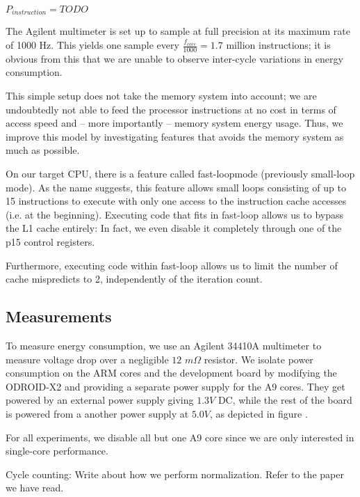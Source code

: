 \begin{center}
$P_{instruction} = TODO$
\end{center}

The Agilent multimeter is set up to sample at full precision at its maximum rate
of 1000 Hz. This yields one sample every $\frac{ f_{core} }{ 1000 } = 1.7$
million instructions; it is obvious from this that we are unable to observe
inter-cycle variations in energy consumption.

This simple setup does not take the memory system into account; we are
undoubtedly not able to feed the processor instructions at no cost in terms of
access speed and -- more importantly -- memory system energy usage. Thus, we
improve this model by investigating features that avoids the memory system as
much as possible.

On our target CPU, there is a feature called fast-loop\texttrademark mode
(previously small-loop mode). As the name suggests, this feature allows small
loops consisting of up to 15 instructions to execute with only one access to the
instruction cache accesses (i.e. at the beginning). Executing code that fits in
fast-loop allows us to bypass the L1 cache entirely: In fact, we even disable it
completely through one of the p15 control registers.

Furthermore, executing code within fast-loop allows us to limit the number of
cache mispredicts to 2, independently of the iteration count.


\subsection{Measurements}
To measure energy consumption, we use an Agilent 34410A multimeter to measure
voltage drop over a negligible $12$ $m\Omega$ resistor. We isolate power
consumption on the ARM cores and the development board by modifying the
ODROID-X2 and providing a separate power supply for the A9 cores. They get
powered by an external power supply giving $1.3V$ DC, while the rest of the
board is powered from a another power supply at $5.0V$, as depicted in figure
.

For all experiments, we disable all but one A9 core since we are only interested
in single-core performance.

Cycle counting: Write about how we perform normalization. Refer to the paper we
have read.
